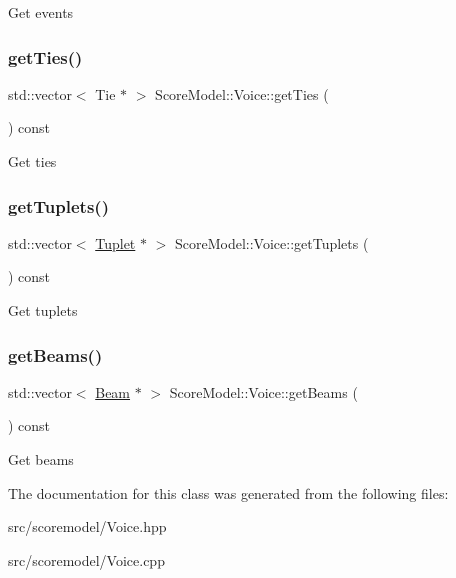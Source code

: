 Get events \mbox{\label{classScoreModel_1_1Voice_aeff975af9f78750447629c56011876f4}} 
\subsubsection{\texorpdfstring{getTies()}{getTies()}}
{\footnotesize\ttfamily std\+::vector$<$ Tie $\ast$ $>$ Score\+Model\+::\+Voice\+::get\+Ties (\begin{DoxyParamCaption}{ }\end{DoxyParamCaption}) const}

Get ties \mbox{\label{classScoreModel_1_1Voice_a535d10ca5d99b50873913e95c4dff50b}} 
\subsubsection{\texorpdfstring{getTuplets()}{getTuplets()}}
{\footnotesize\ttfamily std\+::vector$<$ \mbox{\hyperlink{classScoreModel_1_1Tuplet}{Tuplet}} $\ast$ $>$ Score\+Model\+::\+Voice\+::get\+Tuplets (\begin{DoxyParamCaption}{ }\end{DoxyParamCaption}) const}

Get tuplets \mbox{\label{classScoreModel_1_1Voice_a1d0d1312e5571c1352b19ecb8af6ab35}} 
\subsubsection{\texorpdfstring{getBeams()}{getBeams()}}
{\footnotesize\ttfamily std\+::vector$<$ \mbox{\hyperlink{classScoreModel_1_1Beam}{Beam}} $\ast$ $>$ Score\+Model\+::\+Voice\+::get\+Beams (\begin{DoxyParamCaption}{ }\end{DoxyParamCaption}) const}

Get beams 

The documentation for this class was generated from the following files\+:\begin{DoxyCompactItemize}
\item 
src/scoremodel/Voice.\+hpp\item 
src/scoremodel/Voice.\+cpp\end{DoxyCompactItemize}
